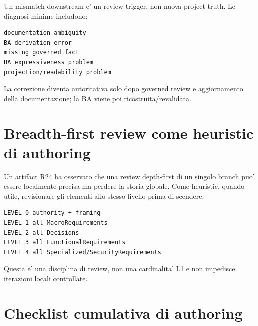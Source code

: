 \documentclass[11pt,a4paper]{article}
\begin{document}
Un mismatch downstream e' un review trigger, non nuova project truth. Le diagnosi minime includono:
\begin{lstlisting}
documentation ambiguity
BA derivation error
missing governed fact
BA expressiveness problem
projection/readability problem
\end{lstlisting}

La correzione diventa autoritativa solo dopo governed review e aggiornamento della documentazione; la BA viene poi ricostruita/revalidata.

\section{Breadth-first review come heuristic di authoring}
\workingtag

Un artifact R24 ha osservato che una review depth-first di un singolo branch puo' essere localmente precisa ma perdere la storia globale. Come heuristic, quando utile, revisionare gli elementi allo stesso livello prima di scendere:

\begin{lstlisting}
LEVEL 0 authority + framing
LEVEL 1 all MacroRequirements
LEVEL 2 all Decisions
LEVEL 3 all FunctionalRequirements
LEVEL 4 all Specialized/SecurityRequirements
\end{lstlisting}

Questa e' una disciplina di review, non una cardinalita' L1 e non impedisce iterazioni locali controllate.

\section{Checklist cumulativa di authoring}
\end{document}
